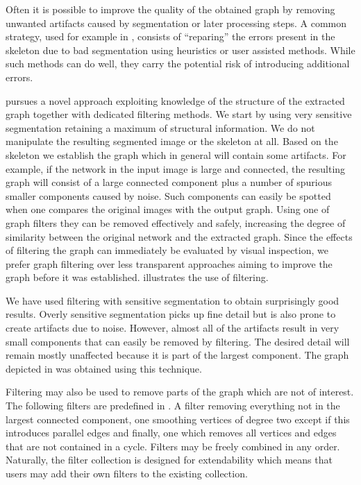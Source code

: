 		Often it is possible to improve the quality of the obtained graph by removing unwanted artifacts caused by segmentation or later processing steps. A common strategy, used for example in \cite{baumgarten2010detection, baumgarten2012computational}, consists of ``reparing'' the errors present in the skeleton due to bad segmentation using heuristics or user assisted methods. While such methods can do well, they carry the potential risk of introducing additional errors. 

		\NEFI pursues a novel approach exploiting knowledge of the structure of the extracted graph together with dedicated filtering methods. We start by using very sensitive segmentation retaining a maximum of structural information. We do not manipulate the resulting segmented image or the skeleton at all. Based on the skeleton we establish the graph which in general will contain some artifacts. For example, if the network in the input image is large and connected, the resulting graph will consist of a large connected component plus a number of spurious smaller components caused by noise. Such components can easily be spotted when one compares the original images with the output graph. Using one of \NEFIs graph filters they can be removed effectively and safely, increasing the degree of similarity between the original network and the extracted graph. Since the effects of filtering the graph can immediately be evaluated by visual inspection, we prefer graph filtering over less transparent approaches aiming to improve the graph before it was established.  illustrates the use of filtering.

		We have used filtering with sensitive segmentation to obtain surprisingly good results. Overly sensitive segmentation picks up fine detail but is also prone to create artifacts due to noise. However, almost all of the artifacts result in very small components that can easily be removed by filtering. The desired detail will remain mostly unaffected because it is part of the largest component. The graph depicted in  was obtained using this technique.

		Filtering may also be used to remove parts of the graph which are not of interest. The following filters are predefined in \NEFI. A filter removing everything not in the largest connected component, one smoothing vertices of degree two except if this introduces parallel edges and finally, one which removes all vertices and edges that are not contained in a cycle. Filters may be freely combined in any order. Naturally, the filter collection is designed for extendability which means that users may add their own filters to the existing collection.

